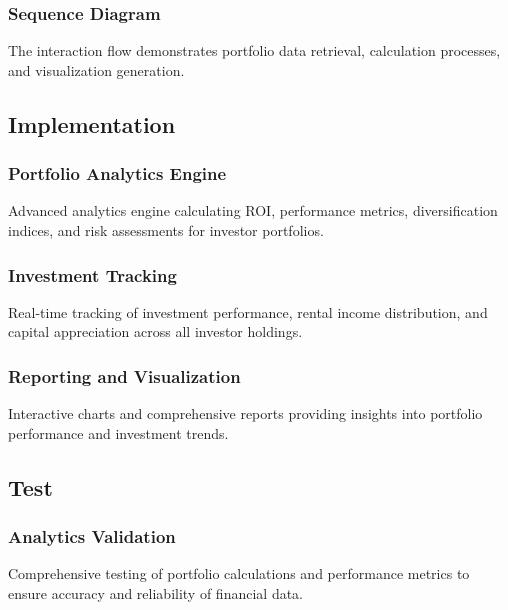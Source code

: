 
\subsubsection{Sequence Diagram}
The interaction flow demonstrates portfolio data retrieval, calculation processes, and visualization generation.


\subsection{Implementation}
\subsubsection{Portfolio Analytics Engine}
Advanced analytics engine calculating ROI, performance metrics, diversification indices, and risk assessments for investor portfolios.

\subsubsection{Investment Tracking}
Real-time tracking of investment performance, rental income distribution, and capital appreciation across all investor holdings.

\subsubsection{Reporting and Visualization}
Interactive charts and comprehensive reports providing insights into portfolio performance and investment trends.

\subsection{Test}
\subsubsection{Analytics Validation}
Comprehensive testing of portfolio calculations and performance metrics to ensure accuracy and reliability of financial data.

